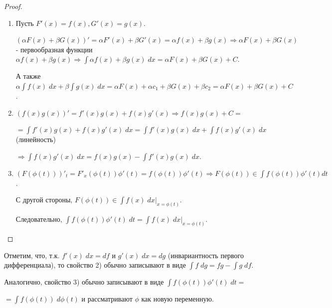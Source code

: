 	\begin{proof}
		\begin{enumerate}
			\item Пусть $F'(x) = f(x), G'(x) = g(x).$
			
			$(\alpha F(x) + \beta G(x))' = \alpha F'(x) + \beta G'(x) = \alpha f(x) + \beta g(x) \Rightarrow \alpha F(x) + \beta G(x)$ - первообразная функции $\alpha f(x) + \beta g(x) \Rightarrow \displaystyle\int \alpha f(x) + \beta g(x) \; dx = \alpha F(x) + \beta G(x) + C$.
					
			А также $\alpha \displaystyle\int f(x) \; dx + \beta \displaystyle\int g(x) \; dx = \alpha F(x) + \alpha c_1 + \beta G(x) + \beta c_2 = \alpha F(x) + \beta G(x) + C$.
			
			\item $(f(x)g(x))' = f'(x)g(x) + f(x)g'(x) \Rightarrow f(x)g(x) + C =$
			
			$=\displaystyle\int f'(x)g(x) + f(x)g'(x) \; dx = \displaystyle\int f'(x)g(x) \; dx + \displaystyle\int f(x)g'(x) \; dx$ (линейность)
			
			$\Rightarrow \displaystyle\int f(x)g'(x) \; dx = f(x)g(x) - \displaystyle\int f'(x)g(x) \; dx$.
			
			\item $(F(\phi(t)))'_t = F'_x(\phi(t))\phi'(t) = f(\phi(t))\phi'(t) \Rightarrow F(\phi(t)) \in \displaystyle\int f(\phi(t))\phi'(t)dt$.
			
			С другой стороны, $F(\phi(t)) \in \displaystyle\int f(x) \; dx \bigg|_{x=\phi(t)}$.
			
			Следовательно, $\displaystyle\int f(\phi(t))\phi'(t) \; dt = \displaystyle\int f(x) \; dx\bigg|_{x=\phi(t)}$.
		\end{enumerate}		
    \end{proof}
    
    \begin{mention}
    	Отметим, что, т.к. $f'(x) \; dx = df$ и $g'(x) \; dx = dg$ (инвариантность первого дифференциала), то свойство 2) обычно записывают в виде $\displaystyle\int f \; dg = fg - \displaystyle\int g \; df$.
    	
    	Аналогично, свойство 3) обычно записывают в виде $\displaystyle\int f(\phi(t))\phi'(t) \; dt =$    	
    	
    	$= \displaystyle\int f(\phi(t)) \; d\phi(t)$ и рассматривают $\phi$ как новую переменную.
    \end{mention}
    
